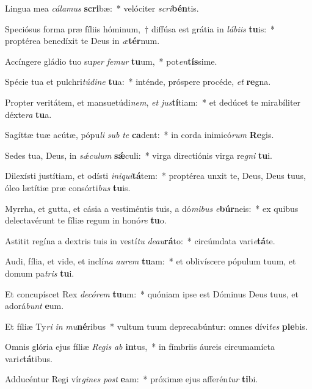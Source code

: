 \item Lingua mea \textit{cá}\textit{la}\textit{mus} \textbf{scri}bæ:~* velóciter \textit{scri}\textbf{bén}tis.
\item Speciósus forma præ fíliis hóminum,~† diffúsa est grátia in \textit{lá}\textit{bi}\textit{is} \textbf{tu}is:~* proptérea benedíxit te Deus in \textit{æ}\textbf{tér}num.
\item Accíngere gládio tuo su\textit{per} \textit{fe}\textit{mur} \textbf{tu}um,~* pot\textit{en}\textbf{tís}sime.
\item Spécie tua et pulchri\textit{tú}\textit{di}\textit{ne} \textbf{tu}a:~* inténde, próspere procéde, \textit{et} \textbf{re}gna.
\item Propter veritátem, et mansuetúdi\textit{nem}, \textit{et} \textit{jus}\textbf{tí}tiam:~* et dedúcet te mirabíliter déxte\textit{ra} \textbf{tu}a.
\item Sagíttæ tuæ acútæ, pópu\textit{li} \textit{sub} \textit{te} \textbf{ca}dent:~* in corda inimicó\textit{rum} \textbf{Re}gis.
\item Sedes tua, Deus, in \textit{sǽ}\textit{cu}\textit{lum} \textbf{sǽ}culi:~* virga directiónis virga re\textit{gni} \textbf{tu}i.
\item Dilexísti justítiam, et odísti \textit{in}\textit{i}\textit{qui}\textbf{tá}tem:~* proptérea unxit te, Deus, Deus tuus, óleo lætítiæ præ consórti\textit{bus} \textbf{tu}is.
\item Myrrha, et gutta, et cásia a vestiméntis tuis, a dó\textit{mi}\textit{bus} \textit{e}\textbf{búr}neis:~* ex quibus delectavérunt te fíliæ regum in honó\textit{re} \textbf{tu}o.
\item Astitit regína a dextris tuis in vestí\textit{tu} \textit{de}\textit{au}\textbf{rá}to:~* circúmdata vari\textit{e}\textbf{tá}te.
\item Audi, fília, et vide, et inclí\textit{na} \textit{au}\textit{rem} \textbf{tu}am:~* et oblivíscere pópulum tuum, et domum pa\textit{tris} \textbf{tu}i.
\item Et concupíscet Rex \textit{de}\textit{có}\textit{rem} \textbf{tu}um:~* quóniam ipse est Dóminus Deus tuus, et adorá\textit{bunt} \textbf{e}um.
\item Et fíliæ Ty\textit{ri} \textit{in} \textit{mu}\textbf{né}ribus~* vultum tuum deprecabúntur: omnes dívi\textit{tes} \textbf{ple}bis.
\item Omnis glória ejus fíliæ \textit{Re}\textit{gis} \textit{ab} \textbf{in}tus,~* in fímbriis áureis circumamícta vari\textit{e}\textbf{tá}tibus.
\item Adducéntur Regi vír\textit{gi}\textit{nes} \textit{post} \textbf{e}am:~* próximæ ejus afferén\textit{tur} \textbf{ti}bi.

